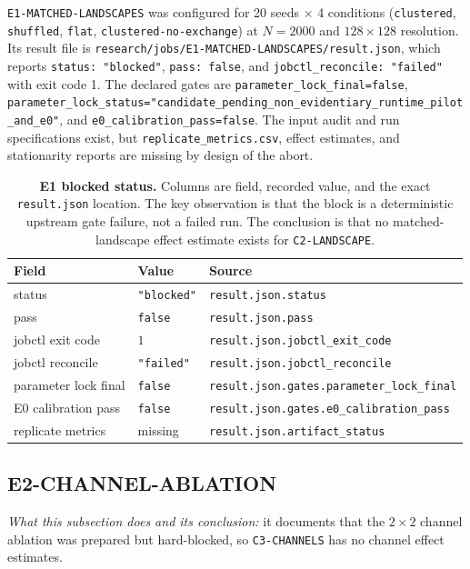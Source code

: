 \documentclass[11pt,a4paper]{article}
\newcommand{\code}[1]{\texttt{#1}}
\begin{document}
\code{E1-MATCHED-LANDSCAPES} was configured for 20 seeds $\times$ 4 conditions
(\code{clustered}, \code{shuffled}, \code{flat}, \code{clustered-no-exchange})
at $N=2000$ and $128\times128$ resolution. Its result file is
\code{research/jobs/E1-MATCHED-LANDSCAPES/result.json}, which reports
\code{status: "blocked"}, \code{pass: false}, and \code{jobctl\_reconcile:
"failed"} with exit code 1. The declared gates are
\code{parameter\_lock\_final=false},
\code{parameter\_lock\_status="candidate\_pending\_non\_evidentiary\_runtime\_pilot\_and\_e0"},
and \code{e0\_calibration\_pass=false}. The input audit and run specifications
exist, but \code{replicate\_metrics.csv}, effect estimates, and stationarity
reports are missing by design of the abort.

\begin{table}[htbp]
\centering
\small
\begin{tabular}{@{}lll@{}}
\toprule
\textbf{Field} & \textbf{Value} & \textbf{Source} \\
\midrule
status & \code{"blocked"} & \code{result.json.status} \\
pass & \code{false} & \code{result.json.pass} \\
jobctl exit code & $1$ & \code{result.json.jobctl\_exit\_code} \\
jobctl reconcile & \code{"failed"} & \code{result.json.jobctl\_reconcile} \\
parameter lock final & \code{false} & \code{result.json.gates.parameter\_lock\_final} \\
E0 calibration pass & \code{false} & \code{result.json.gates.e0\_calibration\_pass} \\
replicate metrics & missing & \code{result.json.artifact\_status} \\
\bottomrule
\end{tabular}
\caption{\textbf{E1 blocked status.} Columns are field, recorded value, and the
exact \code{result.json} location. The key observation is that the block is a
deterministic upstream gate failure, not a failed run. The conclusion is that
no matched-landscape effect estimate exists for \code{C2-LANDSCAPE}.}
\label{tab:e1-block}
\end{table}

\subsection{E2-CHANNEL-ABLATION}
\label{sec:e2}

\emph{What this subsection does and its conclusion:} it documents that the
$2\times2$ channel ablation was prepared but hard-blocked, so
\code{C3-CHANNELS} has no channel effect estimates.
\end{document}
